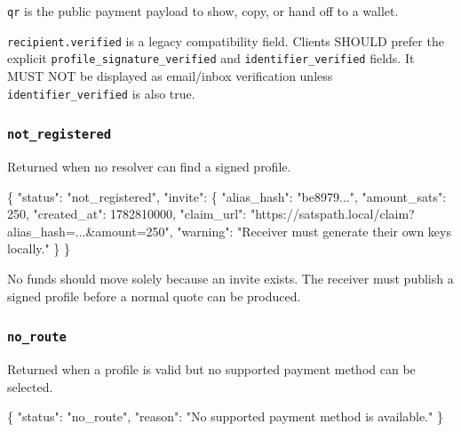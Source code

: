 \documentclass[
]{article}
\newenvironment{Shaded}{}{}
\newcommand{\DataTypeTok}[1]{\textcolor[rgb]{0.56,0.13,0.00}{#1}}
\newcommand{\DecValTok}[1]{\textcolor[rgb]{0.25,0.63,0.44}{#1}}
\newcommand{\FunctionTok}[1]{\textcolor[rgb]{0.02,0.16,0.49}{#1}}
\newcommand{\StringTok}[1]{\textcolor[rgb]{0.25,0.44,0.63}{#1}}
\begin{document}
\texttt{qr} is the public payment payload to show, copy, or hand off to
a wallet.

\texttt{recipient.verified} is a legacy compatibility field. Clients
SHOULD prefer the explicit \texttt{profile\_signature\_verified} and
\texttt{identifier\_verified} fields. It MUST NOT be displayed as
email/inbox verification unless \texttt{identifier\_verified} is also
true.

\hypertarget{not_registered}{%
\subsubsection{\texorpdfstring{\texttt{not\_registered}}{not\_registered}}\label{not_registered}}

Returned when no resolver can find a signed profile.

\begin{Shaded}
\begin{Highlighting}[]
\FunctionTok{\{}
  \DataTypeTok{"status"}\FunctionTok{:} \StringTok{"not\_registered"}\FunctionTok{,}
  \DataTypeTok{"invite"}\FunctionTok{:} \FunctionTok{\{}
    \DataTypeTok{"alias\_hash"}\FunctionTok{:} \StringTok{"be8979..."}\FunctionTok{,}
    \DataTypeTok{"amount\_sats"}\FunctionTok{:} \DecValTok{250}\FunctionTok{,}
    \DataTypeTok{"created\_at"}\FunctionTok{:} \DecValTok{1782810000}\FunctionTok{,}
    \DataTypeTok{"claim\_url"}\FunctionTok{:} \StringTok{"https://satspath.local/claim?alias\_hash=...\&amount=250"}\FunctionTok{,}
    \DataTypeTok{"warning"}\FunctionTok{:} \StringTok{"Receiver must generate their own keys locally."}
  \FunctionTok{\}}
\FunctionTok{\}}
\end{Highlighting}
\end{Shaded}

No funds should move solely because an invite exists. The receiver must
publish a signed profile before a normal quote can be produced.

\hypertarget{no_route}{%
\subsubsection{\texorpdfstring{\texttt{no\_route}}{no\_route}}\label{no_route}}

Returned when a profile is valid but no supported payment method can be
selected.

\begin{Shaded}
\begin{Highlighting}[]
\FunctionTok{\{}
  \DataTypeTok{"status"}\FunctionTok{:} \StringTok{"no\_route"}\FunctionTok{,}
  \DataTypeTok{"reason"}\FunctionTok{:} \StringTok{"No supported payment method is available."}
\FunctionTok{\}}
\end{Highlighting}
\end{Shaded}
\end{document}

